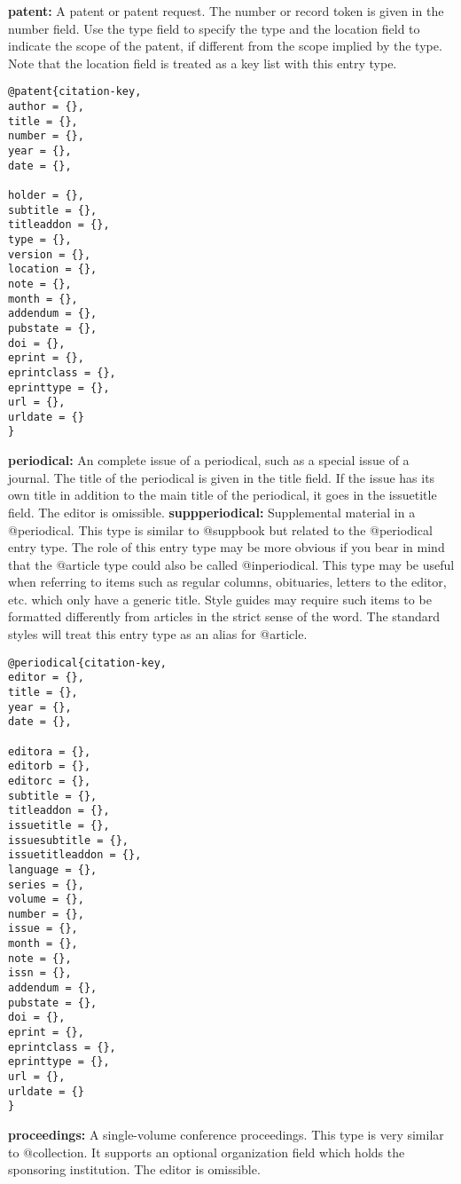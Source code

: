 \documentclass{article}
\begin{document}
\begin{multicols}{2}
\vspace{0.5cm}
\noindent \textbf{patent:} A patent or patent request. The number or record token is given in the number field. Use the type field to specify the type and the location field to indicate the scope of the patent, if different from the scope implied by the type. Note that the location field is treated as a key list with this entry type.
\begin{verbatim}
@patent{citation-key,
author = {},
title = {},
number = {},
year = {},
date = {},

holder = {},
subtitle = {},
titleaddon = {},
type = {},
version = {},
location = {},
note = {},
month = {},
addendum = {},
pubstate = {},
doi = {},
eprint = {},
eprintclass = {},
eprinttype = {},
url = {},
urldate = {}
}
\end{verbatim}

\vspace{0.5cm}
\noindent \textbf{periodical:} An complete issue of a periodical, such as a special issue of a journal. The title of the periodical is given in the title field. If the issue has its own title in addition to the main title of the periodical, it goes in the issuetitle field. The editor is omissible. \textbf{suppperiodical:} Supplemental material in a @periodical. This type is similar to @suppbook but related to the @periodical entry type. The role of this entry type may be more obvious if you bear in mind that the @article type could also be called @inperiodical. This type may be useful when referring to items such as regular columns, obituaries, letters to the editor, etc. which only have a generic title. Style guides may require such items to be formatted differently from articles in the strict sense of the word. The standard styles will treat this entry type as an alias for @article. 

\begin{verbatim}
@periodical{citation-key,
editor = {},
title = {},
year = {},
date = {},

editora = {},
editorb = {},
editorc = {},
subtitle = {},
titleaddon = {},
issuetitle = {},
issuesubtitle = {},
issuetitleaddon = {},
language = {},
series = {},
volume = {},
number = {},
issue = {},
month = {},
note = {},
issn = {},
addendum = {},
pubstate = {},
doi = {},
eprint = {},
eprintclass = {},
eprinttype = {},
url = {},
urldate = {}
}
\end{verbatim}

\vspace{0.5cm}
\noindent \textbf{proceedings:} A single-volume conference proceedings. This type is very similar to @collection. It supports an optional organization field which holds the sponsoring institution. The editor is omissible.
\begin{verbatim}


\end{verbatim}
\end{multicols}
\end{document}
